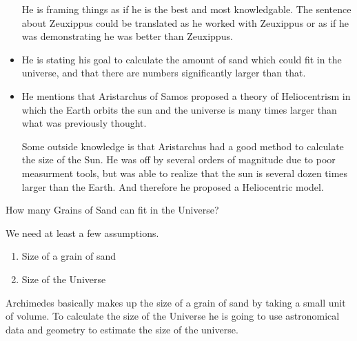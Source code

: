 \documentclass{report}
\begin{document}
\begin{description}
\begin{mdframed}
\begin{itemize}
\begin{mdframed}
                        He is framing things as if he is the best
                        and most knowledgable. The sentence about 
                        Zeuxippus could be translated as he worked
                        with Zeuxippus or as if he was demonstrating
                        he was better than Zeuxippus.
                    \end{mdframed}
                \item He is stating his goal to calculate
                    the amount of sand which could fit
                    in the universe, and that there are
                    numbers significantly larger than that.
                \item He mentions that Aristarchus of Samos
                    proposed a theory of Heliocentrism
                    in which the Earth orbits the sun and
                    the universe is many times larger than
                    what was previously thought.
                    \begin{mdframed}
                        Some outside knowledge is that
                        Aristarchus had a good method to
                        calculate the size of the Sun. He
                        was off by several orders of magnitude
                        due to poor measurment tools, but was
                        able to realize that the sun is several
                        dozen times larger than the Earth. And
                        therefore he proposed a Heliocentric
                        model.
                    \end{mdframed}
            \end{itemize} 
        \end{mdframed}
    \item How many Grains of Sand can fit in the Universe?
        \begin{mdframed}
            We need at least a few assumptions.
            \begin{enumerate}
                \item Size of a grain of sand
                \item Size of the Universe
            \end{enumerate}

            Archimedes basically makes up the size of a grain
            of sand by taking a small unit of volume.
            To calculate the size of the Universe he is going
            to use astronomical data and geometry to estimate
            the size of the universe.


\end{mdframed}
\end{description}
\end{document}
